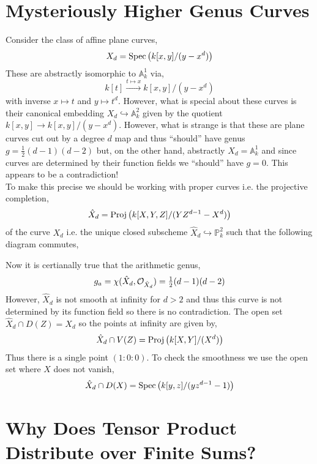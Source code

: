\documentclass[12pt]{extarticle}
\theoremstyle{definition}
\renewcommand{\P}{\mathbb{P}}
\newcommand{\embed}{\hookrightarrow}
\begin{document}
\section{Mysteriously Higher Genus Curves}

\renewcommand{\A}{\mathbb{A}}

Consider the class of affine plane curves,
\[ X_d = \mathrm{Spec}\left(k[x,y]/(y - x^d)\right) \]
These are abstractly isomorphic to $\A^1_k$ via,
\[ k[t] \xrightarrow{t \mapsto x} k[x,y]/(y - x^d) \]
with inverse $x \mapsto t$ and $y \mapsto t^d$. However, what is special about these curves is their canonical embedding $X_d \embed \mathbb{A}^2_k$ given by the quotient $k[x,y] \to k[x,y]/(y  - x^d)$. However, what is strange is that these are plane curves cut out by a degree $d$ map and thus ``should'' have genus $g = \tfrac{1}{2} (d-1)(d-2)$ but, on the other hand, abstractly $X_d = \A^1_k$ and since curves are determined by their function fields we ``should'' have $g = 0$. This appears to be a contradiction!
\bigskip\\
To make this precise we should be working with proper curves i.e. the projective completion,
\[ \hat{X}_d = \mathrm{Proj}\left(k[X,Y,Z]/(Y Z^{d-1} - X^d)\right) \]
of the curve $X_d$ i.e. the unique closed subscheme $\hat{X}_d \embed \P^2_k$ such that the following diagram commutes,
\begin{center}
\end{center}  
Now it is certianally true that the arithmetic genus,
\[ g_a = \chi(\hat{X}_d, \mathcal{O}_{\hat{X}_d}) = \tfrac{1}{2} (d-1)(d-2) \]
However, $\hat{X}_d$ is not smooth at infinity for $d > 2$ and thus this curve is not determined by its function field so there is no contradiction. The open set $\hat{X}_d \cap D(Z) = X_d$ so the points at infinity are given by,
\[ \hat{X}_d \cap V(Z) = \mathrm{Proj}\left(k[X, Y]/(X^d)\right) \]
Thus there is a single point $(1 : 0 : 0)$. To check the smoothness we use the open set where $X$ does not vanish,
\[ \hat{X}_d \cap D(X) = \mathrm{Spec}\left(k[y,z] /(y z^{d-1} - 1)\right) \]



\section{Why Does Tensor Product Distribute over Finite Sums?}
\end{document}
